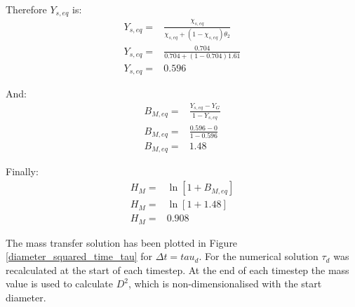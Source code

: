 \documentclass[../Interim_Report_Master]{subfiles}
\begin{document}
Therefore $Y_{s,eq}$ is:
\begin{subequations}
\begin{align}
Y_{s,eq} =& \frac{\chi_{s,eq}}{\chi_{s,eq}+(1-\chi_{s,eq})\theta_2} \\
Y_{s,eq} =& \frac{0.704}{0.704+(1-0.704)1.61} \\
Y_{s,eq} =& 0.596
\end{align}
\end{subequations}

And:
\begin{subequations}
\begin{align}
B_{M,eq} =& \frac{Y_{s,eq}-Y_G}{1-Y_{s,eq}} \\
B_{M,eq} =& \frac{0.596-0}{1-0.596} \\
B_{M,eq} =& 1.48
\end{align}
\end{subequations}

Finally:
\begin{subequations}
\begin{align}
H_M =& \ln\left[1+B_{M,eq}\right] \\
H_M =& \ln\left[1+1.48\right] \\
H_M =& 0.908
\end{align}
\end{subequations}

The mass transfer solution has been plotted in Figure \ref{diameter_squared_time_tau} for $\Delta t=tau_d$. For the numerical solution $\tau_d$ was recalculated at the start of each timestep. At the end of each timestep the mass value is used to calculate $D^2$, which is non-dimensionalised with the start diameter. 
\end{document}
